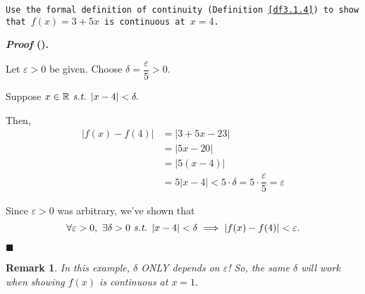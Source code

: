 \documentclass[12pt,a4paper]{article}
\newcounter{nprf}[subsection]
\newtheorem*{rmk}{\indent Remark}
\newenvironment*{prf}{\par\indent\textbf{\textit{Proof} (\stepcounter{nprf}\thenprf). }\par }{\par\hfill $\blacksquare$\par}
\def\R{{\mathbb{R}}}
\def\st{\emph{ s.t. }}
\begin{document}
\begin{framed}
\noindent\texttt{Use the formal definition of continuity (Definition \ref{df3.1.4}) to show that $f(x)=3+5x$ is continuous at $x=4$. }
\begin{prf}
	Let $\varepsilon>0$ be given. Choose $\delta=\dfrac{\varepsilon}{5}>0.$\par Suppose $x\in\R\st|x-4|<\delta.$\par Then, \[\begin{aligned}|f(x)-f(4)|&=|3+5x-23|\\&=|5x-20|\\&=|5(x-4)|\\&=5|x-4|<5\cdot\delta=5\cdot\dfrac{\varepsilon}{5}=\varepsilon\end{aligned}\]\par Since $\varepsilon>0$ was arbitrary, we've shown that \[\forall\varepsilon>0,\ \exists\delta>0\st|x-4|<\delta\implies|f(x)-f(4)|<\varepsilon.\]
\end{prf}
\begin{rmk} In this example, $\delta$ ONLY depends on $\varepsilon$! So, the same $\delta$ will work when showing $f(x)$ is continuous at $x=1.$\end{rmk}
\end{framed}
\end{document}
